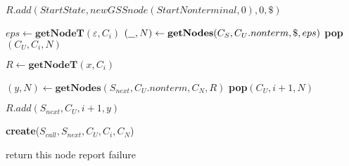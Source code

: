 \begin{algorithmic}
    \State $R.add(StartState, new GSSnode(StartNonterminal,0), 0, \$)$
    
    \State $eps \gets \textbf{getNodeT}(\varepsilon, C_{i})$  
    \State $(\underline{\hspace{0.25cm}}, N) \gets \textbf{getNodes}(C_{S},C_{U}.nonterm, \$, eps)$
    \State \textbf{pop}$(C_{U},C_{i},N)$ 
    \EndIf
    
            \State $R \gets \textbf{getNodeT}(x, C_{i})$
            
            \State $(y, N) \gets \textbf{getNodes}(S_{next},C_{U}.nonterm, C_{N}, R)$
                \State \textbf{pop}$(C_{U},i+1,N)$ 
            \EndIf
            
            \State $R.add(S_{next}, C_{U}, i + 1, y)$
            
        \EndCase
    
            \State \textbf{create}($S_{call}, S_{next}, C_{U}, C_{i}, C_{N}$)
        \EndCase
        \EndSwitch
        
    \EndFor
    \EndWhile
    \State return this node
    \Else
    \State report failure
    \EndIf
\EndFunction
\end{algorithmic}